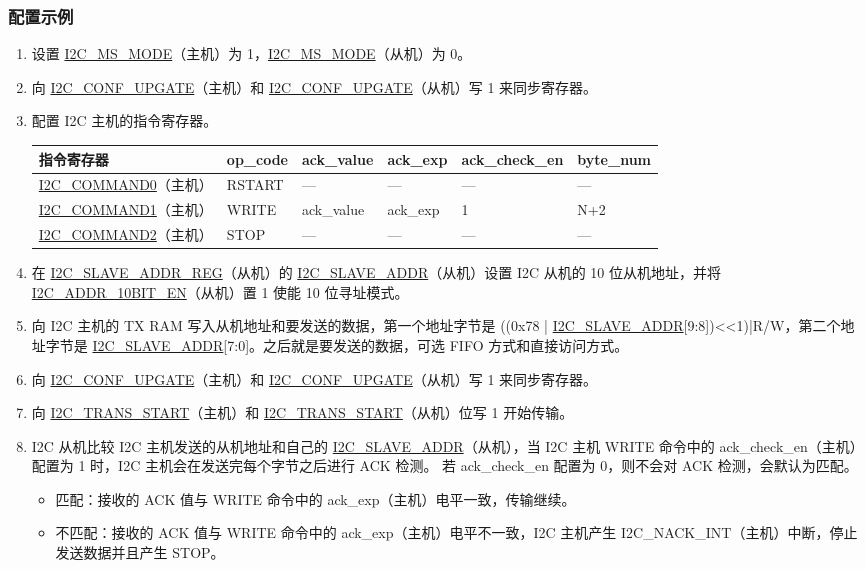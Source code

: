 \documentclass[main\_\_CN.tex]{subfiles}
\begin{document}
\subsubsection{配置示例}
\begin{enumerate}
\item 设置 \hyperref[fielddesc:I2CMSMODE]{I2C\_MS\_MODE}（主机）为 1，\hyperref[fielddesc:I2CMSMODE]{I2C\_MS\_MODE}（从机）为 0。
\item 向 \hyperref[fielddesc:I2CCONFUPGATE]{I2C\_CONF\_UPGATE}（主机）和 \hyperref[fielddesc:I2CCONFUPGATE]{I2C\_CONF\_UPGATE}（从机）写 1 来同步寄存器。
\item 配置 I2C 主机的指令寄存器。

\begin{longtable}{ | p{4cm} | p{2cm} | p{2cm} | p{2cm} |p{2cm} | p{2cm} |}
\hline\rowcolor{lightgray}
指令寄存器& op\_code & ack\_value&ack\_exp&ack\_check\_en&byte\_num  \\ \hline
\hyperref[fielddesc:I2CCOMMAND0]{I2C\_COMMAND0}（主机）& RSTART& ---&---&---&---  \\ \hline
\hyperref[fielddesc:I2CCOMMAND1]{I2C\_COMMAND1}（主机）& WRITE& ack\_value&ack\_exp&1&N+2  \\ \hline
\hyperref[fielddesc:I2CCOMMAND2]{I2C\_COMMAND2}（主机）& STOP& ---&---&---&---  \\ \hline
\end{longtable}

\item 在 \hyperref[regdesc:I2CSLAVEADDRREG]{I2C\_SLAVE\_ADDR\_REG}（从机）的 \hyperref[fielddesc:I2CSLAVEADDR]{I2C\_SLAVE\_ADDR}（从机）设置 I2C 从机的 10 位从机地址，并将 \hyperref[fielddesc:I2CADDR10BITEN]{I2C\_ADDR\_10BIT\_EN}（从机）置 1 使能 10 位寻址模式。
\item 向 I2C 主机的 TX RAM 写入从机地址和要发送的数据，第一个地址字节是 ((0x{}78 | \hyperref[fielddesc:I2CSLAVEADDR]{I2C\_SLAVE\_ADDR}[9:8])<<1)|R/W，第二个地址字节是 \hyperref[fielddesc:I2CSLAVEADDR]{I2C\_SLAVE\_ADDR}[7:0]。之后就是要发送的数据，可选 FIFO 方式和直接访问方式。
\item 向 \hyperref[fielddesc:I2CCONFUPGATE]{I2C\_CONF\_UPGATE}（主机）和 \hyperref[fielddesc:I2CCONFUPGATE]{I2C\_CONF\_UPGATE}（从机）写 1 来同步寄存器。
\item 向 \hyperref[fielddesc:I2CTRANSSTART]{I2C\_TRANS\_START}（主机）和 \hyperref[fielddesc:I2CTRANSSTART]{I2C\_TRANS\_START}（从机）位写 1 开始传输。
\item I2C 从机比较 I2C 主机发送的从机地址和自己的 \hyperref[fielddesc:I2CSLAVEADDR]{I2C\_SLAVE\_ADDR}（从机），当 I2C 主机 WRITE 命令中的 ack\_check\_en（主机）配置为 1 时，I2C 主机会在发送完每个字节之后进行 ACK 检测。 若 ack\_check\_en 配置为 0，则不会对 ACK 检测，会默认为匹配。
\begin{itemize}
\item 匹配：接收的 ACK 值与 WRITE 命令中的 ack\_exp（主机）电平一致，传输继续。
\item 不匹配：接收的 ACK 值与 WRITE 命令中的 ack\_exp（主机）电平不一致，I2C 主机产生 I2C\_NACK\_INT（主机）中断，停止发送数据并且产生 STOP。
\end{itemize}


\end{enumerate}
\end{document}
